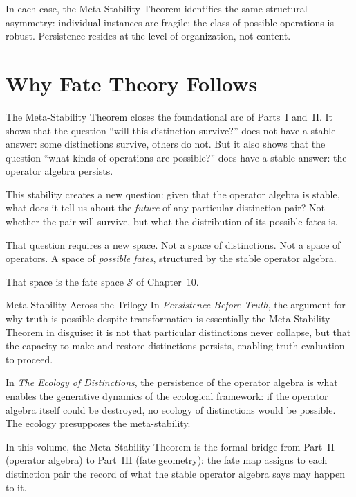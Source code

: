 \documentclass[12pt,twoside,openright]{book}
\newcommand{\fateSpace}{\mathcal{S}}
\begin{document}
In each case, the Meta-Stability Theorem identifies the same
structural asymmetry: individual instances are fragile; the
class of possible operations is robust. Persistence resides
at the level of organization, not content.

\section{Why Fate Theory Follows}

The Meta-Stability Theorem closes the foundational arc of
Parts~I and~II. It shows that the question ``will this
distinction survive?'' does not have a stable answer: some
distinctions survive, others do not. But it also shows that
the question ``what kinds of operations are possible?'' does
have a stable answer: the operator algebra persists.

This stability creates a new question: given that the operator
algebra is stable, what does it tell us about the \emph{future}
of any particular distinction pair? Not whether the pair will
survive, but what the distribution of its possible fates is.

That question requires a new space. Not a space of distinctions.
Not a space of operators. A space of \emph{possible fates},
structured by the stable operator algebra.

That space is the fate space $\fateSpace$ of Chapter~10.

\begin{trilogylink}{Meta-Stability Across the Trilogy}
In \textit{Persistence Before Truth}, the argument for why
truth is possible despite transformation is essentially the
Meta-Stability Theorem in disguise: it is not that particular
distinctions never collapse, but that the capacity to make and
restore distinctions persists, enabling truth-evaluation to
proceed.

In \textit{The Ecology of Distinctions}, the persistence of
the operator algebra is what enables the generative dynamics
of the ecological framework: if the operator algebra itself
could be destroyed, no ecology of distinctions would be
possible. The ecology presupposes the meta-stability.

In this volume, the Meta-Stability Theorem is the formal
bridge from Part~II (operator algebra) to Part~III (fate
geometry): the fate map assigns to each distinction pair the
record of what the stable operator algebra says may happen to
it.
\end{trilogylink}
\end{document}
